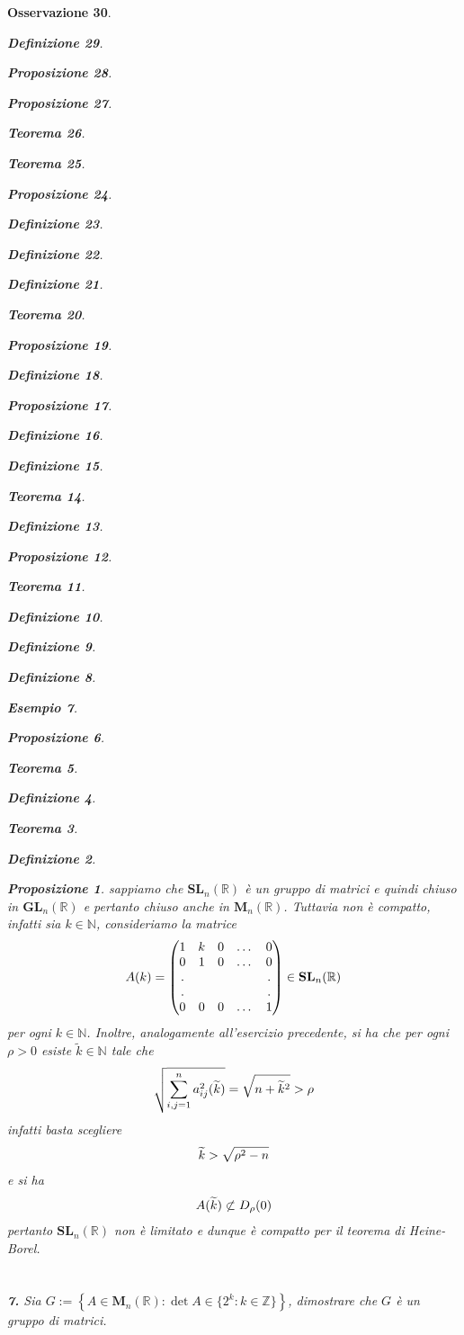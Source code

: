 \documentclass[oneside, 11pt]{amsbook}
\makeatletter
\newcommand{\0}{{(0)}}
\newcommand{\3}{{(3)}}
\theoremstyle{colonplain}
\newtheorem{thm}{Teorema}[chapter]
\newtheorem{prop}[thm]{Proposizione}
\theoremstyle{colondefinition}
\newtheorem{defn}[thm]{Definizione}
\newtheorem{ex}[thm]{Esempio}
\theoremstyle{colonremark}
\newtheorem{rmk}[thm]{Osservazione}
\numberwithin{equation}{chapter}
\renewcommand{\proofname}{Dimostrazione}
\renewenvironment{proof}[1][\proofname]{\par
  \pushQED{\end{proof}}%
  \normalfont \topsep6\p@\@plus6\p@\relax
  \trivlist
  \item[\hskip\labelsep\bfseries #1:]\ignorespaces
}{%
  \popQED\endtrivlist\@endpefalse
}
\makeatother
\begin{document}
\begin{rmk}
\begin{defn}
\begin{prop}
\begin{prop}
\begin{thm}
\begin{thm}
\begin{prop}
\begin{defn}
\begin{defn}
\begin{defn}
\begin{thm}
\begin{prop}
\begin{defn}
\begin{prop}
\begin{defn}
\begin{defn}
\begin{thm}
\begin{defn}
\begin{prop}
\begin{thm}
\begin{defn}
\begin{defn}
\begin{defn}
\begin{ex}
\begin{prop}
\begin{thm}
\begin{defn}
\begin{thm}
\begin{defn}
\begin{prop}
\begin{proof}
\begin{proof}
\begin{proof}
\begin{proof}
\begin{proof}[Soluzione]
\begin{proof} sappiamo che $\mathbf{SL}_n(\mathbb{R})$ è un gruppo di matrici e quindi chiuso in $\mathbf{GL}_n(\mathbb{R})$ e pertanto chiuso anche in $\mathbf{M}_n(\mathbb{R})$. Tuttavia non è compatto, infatti sia $k \in \mathbb{N}$, consideriamo la matrice
\begin{align} A(k) =
    \begin{pmatrix}
        1 & k & 0 & \dots & 0 \\
        0 & 1 & 0 & \dots & 0 \\
        . & & & & . \\
        . & & & & . \\
        0 & 0 & 0 & \dots & 1
    \end{pmatrix} \in \mathbf{SL}_n(\mathbb{R}) \notag
\end{align}
per ogni $k \in \mathbb{N}$. Inoltre, analogamente all'esercizio precedente, si ha che per ogni $\rho > 0$ esiste $\widetilde{k} \in \mathbb{N}$ tale che
\begin{align}
    \sqrt{\sum_{i, j = 1}^n a^2_{ij}(\widetilde{k})} = \sqrt{n + \widetilde{k}^2} > \rho \notag
\end{align}
infatti basta scegliere
\begin{align}
    \widetilde{k} > \sqrt{\rho^2 - n} \notag
\end{align}
e si ha
\begin{align}
    A(\widetilde{k}) \not\subset D_\rho(0) \notag
\end{align}
pertanto $\mathbf{SL}_n(\mathbb{R})$ non è limitato e dunque è compatto per il \textit{teorema di Heine-Borel}. \\ \\ \\
\textbf{7.} Sia $G := \left\{ A \in \mathbf{M}_n(\mathbb{R}) : \det A \in \{ 2^k : k \in \mathbb{Z} \} \right\}$, dimostrare che $G$ è un gruppo di matrici. \\


\end{proof}
\end{proof}
\end{proof}
\end{proof}
\end{proof}
\end{proof}
\end{prop}
\end{defn}
\end{thm}
\end{defn}
\end{thm}
\end{prop}
\end{ex}
\end{defn}
\end{defn}
\end{defn}
\end{thm}
\end{prop}
\end{defn}
\end{thm}
\end{defn}
\end{defn}
\end{prop}
\end{defn}
\end{prop}
\end{thm}
\end{defn}
\end{defn}
\end{defn}
\end{prop}
\end{thm}
\end{thm}
\end{prop}
\end{prop}
\end{defn}
\end{rmk}
\end{document}

